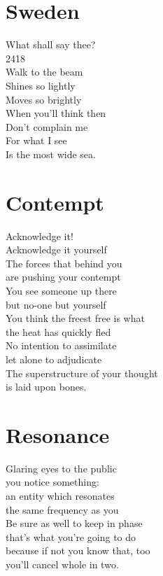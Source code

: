 \documentclass[a4paper,twoside, openany]{book}
\newenvironment{Verse}
  {\center\varwidth{\linewidth}\fontsize{18}{21.6}\selectfont}
  {\endvarwidth\endcenter}
\begin{document}
\chapter{Sweden}
\begin{Verse}
    What shall say thee?\\
    2418\\
    Walk to the beam\\
    Shines so lightly\\
    Moves so brightly\\
    When you’ll think then\\
    Don’t complain me\\
    For what I see\\
    Is the most wide sea.
\end{Verse}

\chapter{Contempt}
\begin{Verse}
    Acknowledge it!\\
    Acknowledge it yourself\\
    The forces that behind you\\
    are pushing your contempt\\
    You see someone up there\\
    but no-one but yourself\\
    You think the freest free is what\\
    the heat has quickly fled\\
    No intention to assimilate\\
    let alone to adjudicate\\
    The superstructure of your thought\\
    is laid upon bones.
\end{Verse}


\chapter{Resonance}
\begin{Verse}
    Glaring eyes to the public\\
    you notice something:\\
    an entity which resonates\\
    the same frequency as you\\
    Be sure as well to keep in phase\\
    that’s what you’re going to do\\
    because if not you know that, too\\
    you’ll cancel whole in two.
\end{Verse}
\end{document}
